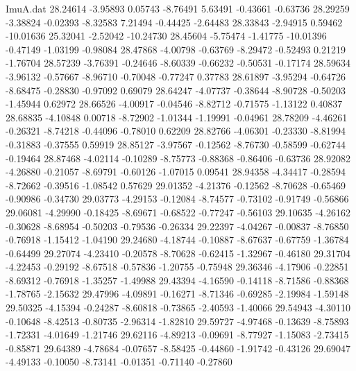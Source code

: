 \begin{filecontents}{ImuA.dat}
  28.24614   -3.95893    0.05743   -8.76491    5.63491   -0.43661   -0.63736
  28.29259   -3.38824   -0.02393   -8.32583    7.21494   -0.44425   -2.64483
  28.33843   -2.94915    0.59462  -10.01636   25.32041   -2.52042  -10.24730
  28.45604   -5.75474   -1.41775  -10.01396   -0.47149   -1.03199   -0.98084
  28.47868   -4.00798   -0.63769   -8.29472   -0.52493    0.21219   -1.76704
  28.57239   -3.76391   -0.24646   -8.60339   -0.66232   -0.50531   -0.17174
  28.59634   -3.96132   -0.57667   -8.96710   -0.70048   -0.77247    0.37783
  28.61897   -3.95294   -0.64726   -8.68475   -0.28830   -0.97092    0.69079
  28.64247   -4.07737   -0.38644   -8.90728   -0.50203   -1.45944    0.62972
  28.66526   -4.00917   -0.04546   -8.82712   -0.71575   -1.13122    0.40837
  28.68835   -4.10848    0.00718   -8.72902   -1.01344   -1.19991   -0.04961
  28.78209   -4.46261   -0.26321   -8.74218   -0.44096   -0.78010    0.62209
  28.82766   -4.06301   -0.23330   -8.81994   -0.31883   -0.37555    0.59919
  28.85127   -3.97567   -0.12562   -8.76730   -0.58599   -0.62744   -0.19464
  28.87468   -4.02114   -0.10289   -8.75773   -0.88368   -0.86406   -0.63736
  28.92082   -4.26880   -0.21057   -8.69791   -0.60126   -1.07015    0.09541
  28.94358   -4.34417   -0.28594   -8.72662   -0.39516   -1.08542    0.57629
  29.01352   -4.21376   -0.12562   -8.70628   -0.65469   -0.90986   -0.34730
  29.03773   -4.29153   -0.12084   -8.74577   -0.73102   -0.91749   -0.56866
  29.06081   -4.29990   -0.18425   -8.69671   -0.68522   -0.77247   -0.56103
  29.10635   -4.26162   -0.30628   -8.68954   -0.50203   -0.79536   -0.26334
  29.22397   -4.04267   -0.00837   -8.76850   -0.76918   -1.15412   -1.04190
  29.24680   -4.18744   -0.10887   -8.67637   -0.67759   -1.36784   -0.64499
  29.27074   -4.23410   -0.20578   -8.70628   -0.62415   -1.32967   -0.46180
  29.31704   -4.22453   -0.29192   -8.67518   -0.57836   -1.20755   -0.75948
  29.36346   -4.17906   -0.22851   -8.69312   -0.76918   -1.35257   -1.49988
  29.43394   -4.16590   -0.14118   -8.71586   -0.88368   -1.78765   -2.15632
  29.47996   -4.09891   -0.16271   -8.71346   -0.69285   -2.19984   -1.59148
  29.50325   -4.15394   -0.24287   -8.60818   -0.73865   -2.40593   -1.40066
  29.54943   -4.30110   -0.10648   -8.42513   -0.80735   -2.96314   -1.82810
  29.59727   -4.97468   -0.13639   -8.75893   -1.72331   -4.01649   -1.21746
  29.62116   -4.89213   -0.09691   -8.77927   -1.15083   -2.73415   -0.85871
  29.64389   -4.78684   -0.07657   -8.58425   -0.44860   -1.91742   -0.43126
  29.69047   -4.49133   -0.10050   -8.73141   -0.01351   -0.71140   -0.27860

\end{filecontents}
